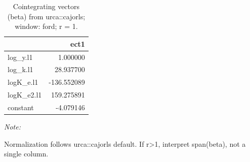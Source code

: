 \begin{table}[!h]
\centering
\caption{Cointegrating vectors (beta) from urca::cajorls; window: ford; r = 1.}
\centering
\begin{threeparttable}
\begin{tabular}[t]{lr}
\toprule
  & ect1\\
\midrule
log\_y.l1 & 1.000000\\
log\_k.l1 & 28.937700\\
logK\_e.l1 & -136.552089\\
logK\_e2.l1 & 159.275891\\
constant & -4.079146\\
\bottomrule
\end{tabular}
\begin{tablenotes}
\item \textit{Note: } 
\item Normalization follows urca::cajorls default. If r>1, interpret span(beta), not a single column.
\end{tablenotes}
\end{threeparttable}
\end{table}
